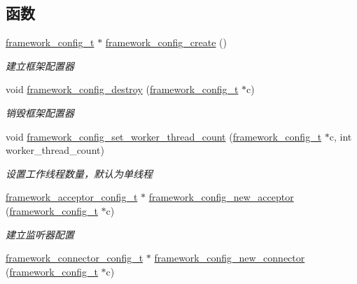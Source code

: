 \subsection*{函数}
\begin{DoxyCompactItemize}
\item 
\hyperlink{a00050_a55b26efa9e6ee05514d087ba2593a54b_a55b26efa9e6ee05514d087ba2593a54b}{framework\+\_\+config\+\_\+t} $\ast$ \hyperlink{a00054_a86930a2422f44672a2ddde80fb6a5b5a_a86930a2422f44672a2ddde80fb6a5b5a}{framework\+\_\+config\+\_\+create} ()
\begin{DoxyCompactList}\small\item\em 建立框架配置器 \end{DoxyCompactList}\item 
void \hyperlink{a00054_a4a798f64988a0fe651e2f247acae55b2_a4a798f64988a0fe651e2f247acae55b2}{framework\+\_\+config\+\_\+destroy} (\hyperlink{a00050_a55b26efa9e6ee05514d087ba2593a54b_a55b26efa9e6ee05514d087ba2593a54b}{framework\+\_\+config\+\_\+t} $\ast$c)
\begin{DoxyCompactList}\small\item\em 销毁框架配置器 \end{DoxyCompactList}\item 
void \hyperlink{a00054_a46fc5d54c72138bced5ddd4068ef77e5_a46fc5d54c72138bced5ddd4068ef77e5}{framework\+\_\+config\+\_\+set\+\_\+worker\+\_\+thread\+\_\+count} (\hyperlink{a00050_a55b26efa9e6ee05514d087ba2593a54b_a55b26efa9e6ee05514d087ba2593a54b}{framework\+\_\+config\+\_\+t} $\ast$c, int worker\+\_\+thread\+\_\+count)
\begin{DoxyCompactList}\small\item\em 设置工作线程数量，默认为单线程 \end{DoxyCompactList}\item 
\hyperlink{a00050_a61a4e424ff4c86631423dedd97c40064_a61a4e424ff4c86631423dedd97c40064}{framework\+\_\+acceptor\+\_\+config\+\_\+t} $\ast$ \hyperlink{a00054_a74c94573fba40eb46f9e183fab029978_a74c94573fba40eb46f9e183fab029978}{framework\+\_\+config\+\_\+new\+\_\+acceptor} (\hyperlink{a00050_a55b26efa9e6ee05514d087ba2593a54b_a55b26efa9e6ee05514d087ba2593a54b}{framework\+\_\+config\+\_\+t} $\ast$c)
\begin{DoxyCompactList}\small\item\em 建立监听器配置 \end{DoxyCompactList}\item 
\hyperlink{a00050_a81253f4c995b97e69be0e67f7a26097f_a81253f4c995b97e69be0e67f7a26097f}{framework\+\_\+connector\+\_\+config\+\_\+t} $\ast$ \hyperlink{a00054_a4ff6334d19e68c08b5741ee7fed02f81_a4ff6334d19e68c08b5741ee7fed02f81}{framework\+\_\+config\+\_\+new\+\_\+connector} (\hyperlink{a00050_a55b26efa9e6ee05514d087ba2593a54b_a55b26efa9e6ee05514d087ba2593a54b}{framework\+\_\+config\+\_\+t} $\ast$c)

\end{DoxyCompactItemize}
